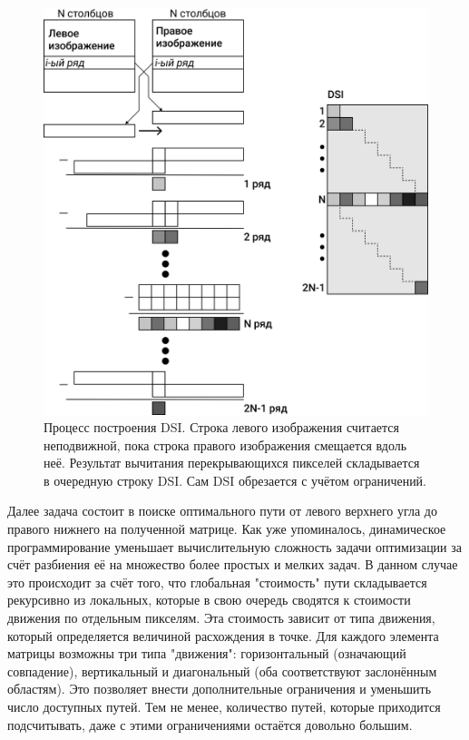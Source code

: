 \begin{figure}[H]
	\begin{center}
		\includegraphics[scale=0.04]{pics/DSI_rus.png}
		\caption{Процесс построения DSI. Строка левого изображения считается неподвижной, пока строка правого изображения смещается вдоль неё. Результат вычитания 
				 перекрывающихся пикселей складывается в очередную строку DSI. Сам DSI обрезается с учётом ограничений.	} 
		\label{pic:DSI} %
	\end{center}
\end{figure}
Далее задача состоит в поиске оптимального пути от левого верхнего угла до правого нижнего на полученной матрице. Как уже упоминалось, динамическое программирование уменьшает 
вычислительную сложность задачи оптимизации  за счёт разбиения её на множество более простых и мелких задач. В данном случае это происходит за счёт того, что глобальная "стоимость" пути 
складывается рекурсивно из локальных, которые в свою очередь сводятся к стоимости движения по отдельным пикселям. Эта стоимость зависит от типа движения, который определяется величиной расхождения
в точке. Для каждого элемента матрицы возможны три типа "движения": горизонтальный (означающий совпадение), вертикальный и диагональный (оба соответствуют заслонённым областям). 
Это позволяет внести дополнительные ограничения и уменьшить число доступных путей. Тем не менее, количество путей, которые приходится подсчитывать, даже с этими ограничениями 
 остаётся довольно большим.

